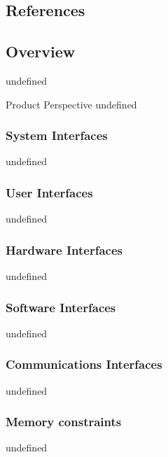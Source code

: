 \documentclass[letterpaper,10pt,compsoc,draftclsnofoot,onecolumn]{IEEEtran}
\begin{document}
\subsection{References}
\nocite{Article}
\nocite{Electronic}
\nocite{Standard}
\begingroup
\renewcommand{\addcontentsline}[3][]{}
\renewcommand\refname{}
\renewcommand{\section}[2]{}%


\endgroup

\subsection{Overview}
undefined

\section{Overall Description}
\subsection{Product Perspective}
undefined

\subsubsection{System Interfaces}
undefined

\subsubsection{User Interfaces}
undefined

\subsubsection{Hardware Interfaces}
undefined

\subsubsection{Software Interfaces}
undefined

\subsubsection{Communications Interfaces}
undefined

\subsubsection{Memory constraints}
undefined
\end{document}
